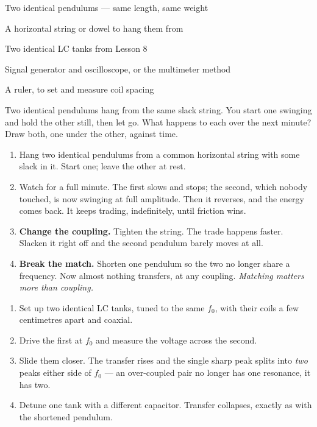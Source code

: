 



\begin{materials}
\item Two identical pendulums --- same length, same weight
\item A horizontal string or dowel to hang them from
\item Two identical LC tanks from Lesson 8
\item Signal generator and oscilloscope, or the multimeter method
\item A ruler, to set and measure coil spacing
\end{materials}

\begin{predict}
Two identical pendulums hang from the same slack string. You start one swinging
and hold the other still, then let go. What happens to each over the next
minute? Draw both, one under the other, against time.
\end{predict}

\begin{enumerate}
\item Hang two identical pendulums from a common horizontal string with some
  slack in it. Start one; leave the other at rest.
\item Watch for a full minute. The first slows and stops; the second, which
  nobody touched, is now swinging at full amplitude. Then it reverses, and the
  energy comes back. It keeps trading, indefinitely, until friction wins.
\item \textbf{Change the coupling.} Tighten the string. The trade happens faster.
  Slacken it right off and the second pendulum barely moves at all.
\item \textbf{Break the match.} Shorten one pendulum so the two no longer share
  a frequency. Now almost nothing transfers, at any coupling. \emph{Matching
  matters more than coupling.}
\end{enumerate}

\begin{enumerate}
\item Set up two identical LC tanks, tuned to the same $f_0$, with their coils a
  few centimetres apart and coaxial.
\item Drive the first at $f_0$ and measure the voltage across the second.
\item Slide them closer. The transfer rises and the single sharp peak splits
  into \emph{two} peaks either side of $f_0$ --- an over-coupled pair no longer
  has one resonance, it has two.
\item Detune one tank with a different capacitor. Transfer collapses, exactly as
  with the shortened pendulum.
\end{enumerate}

